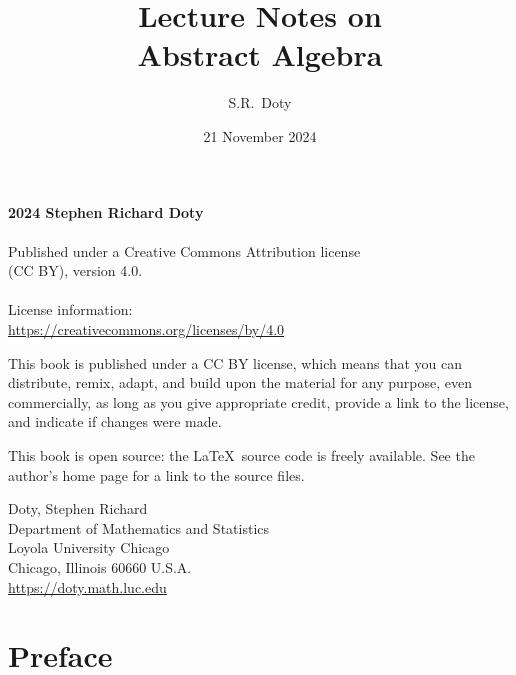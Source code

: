 \documentclass[11pt,oneside]{book}
\title{\bf\Huge Lecture Notes on\\Abstract Algebra}
\author{\Large S.R.~Doty}
\date{\large 21 November 2024}
\theoremstyle{definition}
\numberwithin{equation}{section}
\begin{document}
\maketitle

\thispagestyle{empty}
\begingroup
\parindent 0pt
\parskip \baselineskip

\vskip 1in

\begin{center}
\textcopyright{} \textbf{2024 Stephen Richard Doty}\\
\ \\  
Published under a Creative Commons 
Attribution license\\
(CC BY), version 4.0.\\
{\ } \\ 
License information:\\
\url{https://creativecommons.org/licenses/by/4.0}\\
\end{center}

\vfill

This book is published under a CC BY license, which means that you can
distribute, remix, adapt, and build upon the material for any purpose,
even commercially, as long as you give appropriate credit, provide a
link to the license, and indicate if changes were made.

This book is open source: the \LaTeX\ source code is freely available.
See the author's home page for a link to the source files.



\vfill


Doty, Stephen Richard\\
Department of Mathematics and Statistics \\
Loyola University Chicago \\
Chicago, Illinois 60660 U.S.A.\\
\url{https://doty.math.luc.edu}\\


\endgroup
\clearpage



\frontmatter

\tableofcontents

\newpage
\chapter{Preface}

\end{document}
